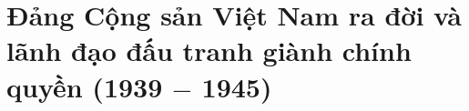 \chapter{Đảng Cộng sản Việt Nam ra đời và lãnh đạo đấu tranh giành chính quyền (1939 $-$ 1945)}





